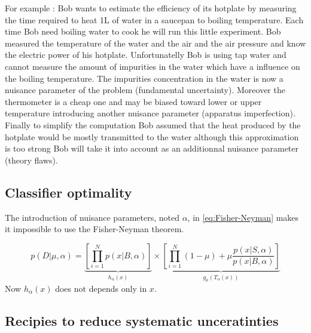 For example : Bob wants to estimate the efficiency of its hotplate by measuring the time required to heat 1L of water in a saucepan to boiling temperature.
Each time Bob need boiling water to cook he will run this little experiment.
Bob measured the temperature of the water and the air and the air pressure and know the electric power of his hotplate.
Unfortunatelly Bob is using tap water and cannot measure the amount of impurities in the water which have a influence on the boiling temperature.
The impurities concentration in the water is now a nuisance parameter of the problem (fundamental uncertainty).
Moreover the thermometer is a cheap one and may be biased toward lower or upper temperature introducing another nuisance parameter (apparatus imperfection).
Finally to simplify the computation Bob assumed that the heat produced by the hotplate would be mostly transmitted to the water although this approximation is too strong Bob will take it into account as an additionnal nuisance parameter (theory flaws).











\subsection{Classifier optimality} %
\label{sub:classifier_optimality}


The introduction of nuisance parameters, noted $\alpha$, in \autoref{eq:Fisher-Neyman} makes it impossible to use the Fisher-Neyman theorem.

\begin{equation}
	p(D|\mu, \alpha) = \underbrace{\left[ \prod_{i=1}^N p(x|B, \alpha) \right ]}_{h_\alpha(x)} \times 
       \underbrace{\left [\prod_{i=1}^N (1-\mu) + \mu \frac{p(x|S, \alpha)}{p(x|B, \alpha)} \right ]}_{g_\mu(T_\alpha(x))}
\end{equation}
Now $h_\alpha(x)$ does not depends only in $x$.






\subsection{Recipies to reduce systematic unceratinties} %
\label{sub:recipies_to_reduce_systematic_unceratinties}


